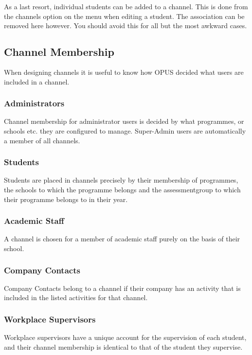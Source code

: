 \documentclass[12 pt]{book}
\begin{document}
As a last resort, individual students can be added to a channel. This is done
from the channels option on the menu when editing a student. The association
can be removed here however. You should avoid this for all but the most
awkward cases.

\subsection{Channel Membership}

When designing channels it is useful to know how OPUS decided what users are
included in a channel.

\subsubsection{Administrators}

Channel membership for administrator users is decided by what programmes, or
schools etc. they are configured to manage. Super-Admin users are automatically
a member of all channels.

\subsubsection{Students}

Students are placed in channels precisely by their membership of programmes,
the schools to which the programme belongs and the assessmentgroup to which
their programme belongs to in their year.

\subsubsection{Academic Staff}

A channel is chosen for a member of academic staff purely on the basis of their
school.

\subsubsection{Company Contacts}

Company Contacts belong to a channel if their company has an activity that is
included in the listed activities for that channel.

\subsubsection{Workplace Supervisors}

Workplace supervisors have a unique account for the supervision of each student,
and their channel membership is identical to that of the student they
supervise.
\end{document}
